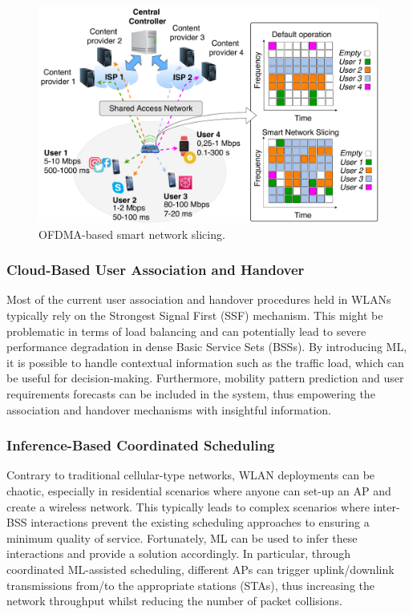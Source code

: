 \documentclass{article}
\begin{document}
\begin{figure}[ht!]
	\centering
	\includegraphics[width=1\columnwidth]{network_slicing_ofdma}
	\caption{OFDMA-based smart network slicing.}
	\label{fig:use_cases}
\end{figure}

\subsubsection{Cloud-Based User Association and Handover}
Most of the current user association and handover procedures held in WLANs typically rely on the Strongest Signal First (SSF) mechanism. This might be problematic in terms of load balancing and can potentially lead to severe performance degradation in dense Basic Service Sets (BSSs). By introducing ML, it is possible to handle contextual information such as the traffic load, which can be useful for decision-making. Furthermore, mobility pattern prediction and user requirements forecasts can be included in the system, thus empowering the association and handover mechanisms with insightful information.

\subsubsection{Inference-Based Coordinated Scheduling}
Contrary to traditional cellular-type networks, WLAN deployments can be chaotic, especially in residential scenarios where anyone can set-up an AP and create a wireless network. This typically leads to complex scenarios where inter-BSS interactions prevent the existing scheduling approaches to ensuring a minimum quality of service. Fortunately, ML can be used to infer these interactions and provide a solution accordingly. In particular, through coordinated ML-assisted scheduling, different APs can trigger uplink/downlink transmissions from/to the appropriate stations (STAs), thus increasing the network throughput whilst reducing the number of packet collisions.
\end{document}
